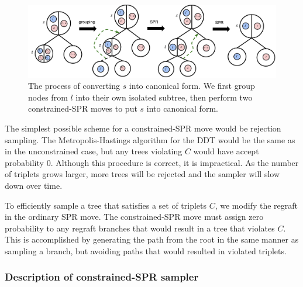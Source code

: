 \begin{figure}
    \centering
    \includegraphics[width=\textwidth]{img/ibhc/CanonicalTree}
    \caption{The process of converting $s$ into canonical form.
    We first group nodes from $l$ into their own isolated subtree, then perform
    two constrained-SPR moves to put $s$ into canonical form.}
    \label{fig:canonical}
\end{figure}

%


The simplest possible scheme for a constrained-SPR move 
would be rejection sampling. The Metropolis-Hastings
algorithm for the DDT would be the same as in the
unconstrained case,
but any trees violating $C$ would have accept
probability $0$. Although this procedure is correct,
it is impractical. As the number of triplets
grows larger, more trees will be rejected
and the sampler will slow down over time.

To efficiently sample a tree that satisfies a set of triplets $C$, 
we modify the regraft in the ordinary SPR move. 
The constrained-SPR move must assign zero probability
to any regraft branches that would result in a tree
that violates $C$.
This is accomplished by generating the path from the root
in the same manner as sampling a branch,
but avoiding paths that would resulted in violated triplets.


\subsubsection*{Description of constrained-SPR sampler}

